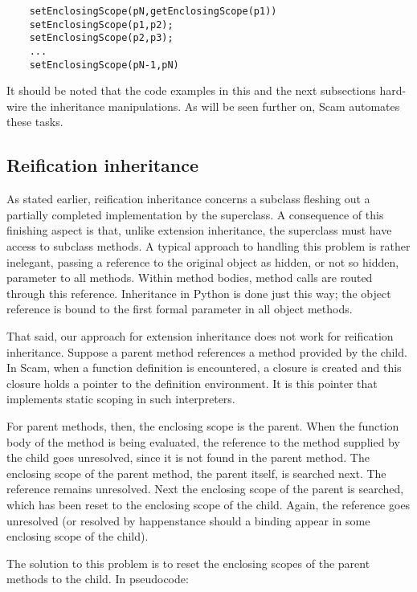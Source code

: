 {{\begin{verbatim}
    setEnclosingScope(pN,getEnclosingScope(p1))
    setEnclosingScope(p1,p2);
    setEnclosingScope(p2,p3);
    ...
    setEnclosingScope(pN-1,pN)
\end{verbatim}

It should be noted that the code examples in this and the next subsections
hard-wire the inheritance manipulations. As will be seen further on,
Scam automates these tasks.

\subsection{Reification inheritance}

As stated earlier, reification inheritance concerns a subclass fleshing
out a partially completed implementation by the superclass. A consequence
of this finishing aspect is that, unlike extension inheritance, the
superclass must have access to subclass methods.  A typical approach
to handling this problem is rather inelegant, passing a reference to
the original object as hidden, or not so hidden,
parameter to all methods.  Within method
bodies, method calls are routed through this reference. Inheritance in
Python is done just this way; the object reference is bound to the
first formal parameter in all object methods.

That said, our approach for extension inheritance
does not work for reification inheritance. Suppose a parent method
references a method provided by the child. In Scam,
when a function definition is encountered, a closure is
created and this closure holds a pointer to the definition environment. It
is this pointer that implements static scoping in such interpreters.

For parent methods, then, the enclosing scope is the parent.  When the
function body of the method is being evaluated, the reference to the
method supplied by the child goes unresolved, since it is not found in
the parent method. The enclosing scope of the parent method, the parent
itself, is searched next.  The reference remains unresolved. Next the
enclosing scope of the parent is searched, which has been reset to the
enclosing scope of the child. Again, the reference goes unresolved (or
resolved by happenstance should a binding appear in some enclosing scope
of the child).

The solution to this problem is to reset the enclosing scopes of the
parent methods to the child. In pseudocode:

}}
